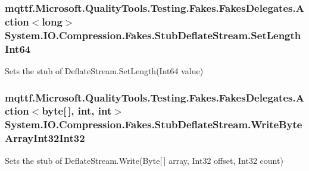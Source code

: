 \hypertarget{class_system_1_1_i_o_1_1_compression_1_1_fakes_1_1_stub_deflate_stream_a8cd473b9b62fa624ae8c9b05c9783995}{
\subsubsection[{Set\-Length\-Int64}]{\setlength{\rightskip}{0pt plus 5cm}mqttf.\-Microsoft.\-Quality\-Tools.\-Testing.\-Fakes.\-Fakes\-Delegates.\-Action$<$long$>$ System.\-I\-O.\-Compression.\-Fakes.\-Stub\-Deflate\-Stream.\-Set\-Length\-Int64}}\label{class_system_1_1_i_o_1_1_compression_1_1_fakes_1_1_stub_deflate_stream_a8cd473b9b62fa624ae8c9b05c9783995}


Sets the stub of Deflate\-Stream.\-Set\-Length(\-Int64 value)

\hypertarget{class_system_1_1_i_o_1_1_compression_1_1_fakes_1_1_stub_deflate_stream_ad8cfd3a95d3a6dbdcaa8f16e3769007f}{
\subsubsection[{Write\-Byte\-Array\-Int32\-Int32}]{\setlength{\rightskip}{0pt plus 5cm}mqttf.\-Microsoft.\-Quality\-Tools.\-Testing.\-Fakes.\-Fakes\-Delegates.\-Action$<$byte\mbox{[}$\,$\mbox{]}, int, int$>$ System.\-I\-O.\-Compression.\-Fakes.\-Stub\-Deflate\-Stream.\-Write\-Byte\-Array\-Int32\-Int32}}\label{class_system_1_1_i_o_1_1_compression_1_1_fakes_1_1_stub_deflate_stream_ad8cfd3a95d3a6dbdcaa8f16e3769007f}


Sets the stub of Deflate\-Stream.\-Write(\-Byte\mbox{[}$\,$\mbox{]} array, Int32 offset, Int32 count)

